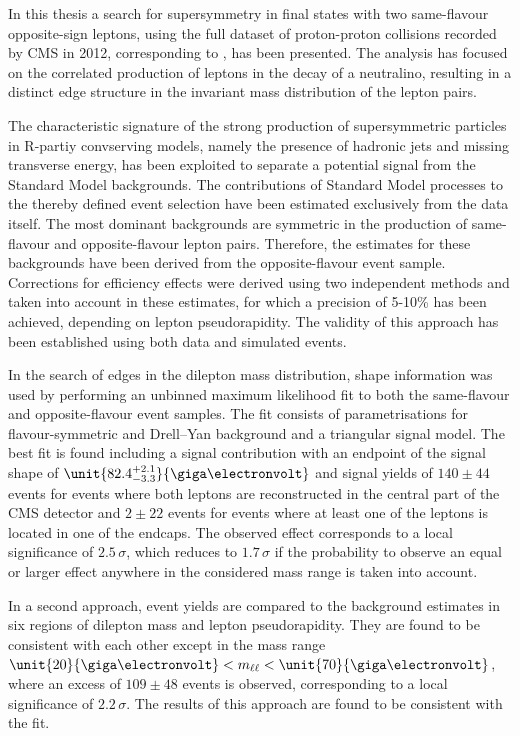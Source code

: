 In this thesis a search for supersymmetry in final states with two same-flavour opposite-sign leptons, using the full dataset of proton-proton collisions recorded by CMS in 2012, corresponding to \lumi, has been presented. The analysis has focused on the correlated production of leptons in the decay of a neutralino, resulting in a distinct edge structure in the invariant mass distribution of the lepton pairs. 

The characteristic signature of the strong production of supersymmetric particles in R-partiy convserving models, namely the presence of hadronic jets and missing transverse energy, has been exploited to separate a potential signal from the Standard Model backgrounds. The contributions of Standard Model processes to the thereby defined event selection have been estimated exclusively from the data itself. The most dominant backgrounds are symmetric in the production of same-flavour and opposite-flavour lepton pairs. Therefore, the estimates for these backgrounds have been derived from the opposite-flavour event sample. Corrections for efficiency effects were derived using two independent methods and taken into account in these estimates, for which a precision of 5-10\% has been achieved, depending on lepton pseudorapidity. The validity of this approach has been established using both data and simulated events. 

In the search of edges in the dilepton mass distribution, shape information was used by performing an unbinned maximum likelihood fit to both the same-flavour and opposite-flavour event samples. The fit consists of parametrisations for flavour-symmetric and Drell--Yan background and a triangular signal model. The best fit is found including a signal contribution with an endpoint of the signal shape of $\unit{82.4^{+2.1}_{-3.3}}{\giga\electronvolt}$ and signal yields of $140\pm44$ events for events where both leptons are reconstructed in the central part of the CMS detector and $2\pm22$ events for events where at least one of the leptons is located in one of the endcaps. The observed effect corresponds to a local significance of $2.5\,\sigma$, which reduces to $1.7\,\sigma$ if the probability to observe an equal or larger effect anywhere in the considered mass range is taken into account. 

In a second approach, event yields are compared to the background estimates in six regions of dilepton mass and lepton pseudorapidity. They are found to be consistent with each other except in the mass range $\unit{20}{\giga\electronvolt} < \mll < \unit{70}{\giga\electronvolt}$, where an excess of $109\pm48$ events is observed, corresponding to a local significance of $2.2\,\sigma$. The results of this approach are found to be consistent with the fit. 

